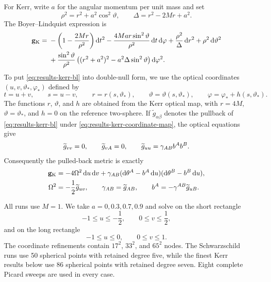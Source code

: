 For Kerr, write $a$ for the angular momentum per unit mass and set
\begin{equation}
  \rho^2=r^2+a^2\cos^2\vartheta,\qquad
  \Delta=r^2-2Mr+a^2.
\end{equation}
The Boyer--Lindquist expression is
\begin{align}\label{eq:results-kerr-bl}
  \mathbf g_{\mathrm K}={}&
  -\left(1-\frac{2Mr}{\rho^2}\right)\mathop{}\!\mathrm d t^2
  -\frac{4Mar\sin^2\vartheta}{\rho^2}\mathop{}\!\mathrm d t\mathop{}\!\mathrm d\varphi
  +\frac{\rho^2}{\Delta}\mathop{}\!\mathrm d r^2+\rho^2\mathop{}\!\mathrm d\vartheta^2 \notag\\
  &+\frac{\sin^2\vartheta}{\rho^2}
  \left((r^2+a^2)^2-a^2\Delta\sin^2\vartheta\right)\mathop{}\!\mathrm d\varphi^2.
\end{align}
To put \eqref{eq:results-kerr-bl} into double-null form, we use the optical
coordinates $(u,v,\vartheta_*,\varphi_*)$ defined by
\begin{equation}\label{eq:results-kerr-coordinate-map}
  t=u+v,\qquad s=u-v,\qquad
  r=r(s,\vartheta_*),\qquad
  \vartheta=\vartheta(s,\vartheta_*),\qquad
  \varphi=\varphi_*+h(s,\vartheta_*).
\end{equation}
The functions $r$, $\vartheta$, and $h$ are obtained from the Kerr optical
map, with $r=4M$, $\vartheta=\vartheta_*$, and $h=0$ on the reference
two-sphere.  If $\widetilde g_{\alpha\beta}$ denotes the pullback of
\eqref{eq:results-kerr-bl} under \eqref{eq:results-kerr-coordinate-map}, the
optical equations give
\begin{equation}
  \widetilde g_{vv}=0,\qquad \widetilde g_{vA}=0,\qquad
  \widetilde g_{uu}=\gamma_{AB}b^Ab^B.
\end{equation}
Consequently the pulled-back metric is exactly
\begin{align}\label{eq:results-kerr-double-null}
  \mathbf g_{\mathrm K}
  &=-4\Omega^2\mathop{}\!\mathrm d u\mathop{}\!\mathrm d v
   +\gamma_{AB}(\mathop{}\!\mathrm d\theta^A-b^A\mathop{}\!\mathrm d u)
                  (\mathop{}\!\mathrm d\theta^B-b^B\mathop{}\!\mathrm d u), \notag\\
  \Omega^2&=-\frac12\widetilde g_{uv},\qquad
  \gamma_{AB}=\widetilde g_{AB},\qquad
  b^A=-\gamma^{AB}\widetilde g_{uB}.
\end{align}

All runs use $M=1$.  We take $a=0,0.3,0.7,0.9$ and solve on the short
rectangle
\begin{equation}
  -1\leq u\leq-\frac12,\qquad 0\leq v\leq\frac12,
\end{equation}
and on the long rectangle
\begin{equation}
  -1\leq u\leq0,\qquad 0\leq v\leq1.
\end{equation}
The coordinate refinements contain $17^2$, $33^2$, and $65^2$ nodes.  The
Schwarzschild runs use 50 spherical points with retained degree five, while
the finest Kerr results below use 86 spherical points with retained degree
seven.  Eight complete Picard sweeps are used in every case.

